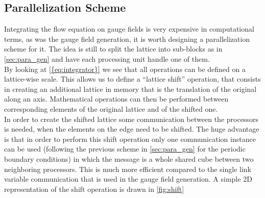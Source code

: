 \subsection{Parallelization Scheme}
\label{sec:shift}
Integrating the flow equation on gauge fields is very expensive in computational terms, as was the gauge field generation,  it is worth designing a parallelization scheme for it. The idea is still to split the lattice into sub-blocks as in \cref{sec:para_gen} and have each processing unit handle one of them.\\
By looking at \cref{{eq:integrator}} we see that all operations can be defined on a lattice-wise scale. This allows us to define a ``lattice shift'' operation, that consists in creating an additional lattice in memory that is the translation of the original along an axis. Mathematical operations can then be performed between corresponding elements of the original lattice and of the shifted one. \\
In order to create the shifted lattice some communication between the processors is needed, when the elements on the edge need to be shifted. The huge advantage is that in order to perform this shift operation only one communication instance can be used (following the previous scheme in \cref{sec:para_gen} for the periodic boundary conditions) in which the message is a whole shared cube between two neighboring processors. This is much more efficient compared to the single link variable communication that is used in the gauge field generation. A simple 2D representation of the shift operation is drawn in \cref{fig:shift}


